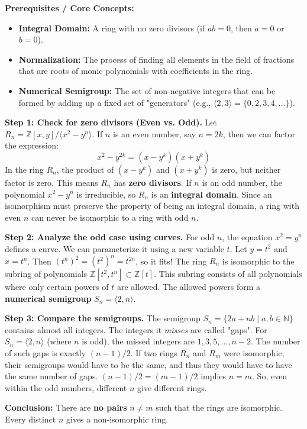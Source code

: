 \begin{solution}
\textbf{Prerequisites / Core Concepts:}
\begin{itemize}
    \item \textbf{Integral Domain:} A ring with no zero divisors (if $ab=0$, then $a=0$ or $b=0$).
    \item \textbf{Normalization:} The process of finding all elements in the field of fractions that are roots of monic polynomials with coefficients in the ring.
    \item \textbf{Numerical Semigroup:} The set of non-negative integers that can be formed by adding up a fixed set of "generators" (e.g., $\langle 2, 3 \rangle = \{0, 2, 3, 4, \dots\}$).
\end{itemize}

\textbf{Step 1: Check for zero divisors (Even vs. Odd).}
Let $R_n = \mathbb{Z}[x, y] / \langle x^2 - y^n \rangle$.
If $n$ is an even number, say $n=2k$, then we can factor the expression:
\[ x^2 - y^{2k} = (x - y^k)(x + y^k) \]
In the ring $R_n$, the product of $(x-y^k)$ and $(x+y^k)$ is zero, but neither factor is zero. This means $R_n$ has \textbf{zero divisors}.
If $n$ is an odd number, the polynomial $x^2 - y^n$ is irreducible, so $R_n$ is an \textbf{integral domain}.
Since an isomorphism must preserve the property of being an integral domain, a ring with even $n$ can never be isomorphic to a ring with odd $n$.

\textbf{Step 2: Analyze the odd case using curves.}
For odd $n$, the equation $x^2 = y^n$ defines a curve. We can parameterize it using a new variable $t$.
Let $y = t^2$ and $x = t^n$. Then $(t^n)^2 = (t^2)^n = t^{2n}$, so it fits!
The ring $R_n$ is isomorphic to the subring of polynomials $\mathbb{Z}[t^2, t^n] \subset \mathbb{Z}[t]$.
This subring consists of all polynomials where only certain powers of $t$ are allowed. The allowed powers form a \textbf{numerical semigroup} $S_n = \langle 2, n \rangle$.

\textbf{Step 3: Compare the semigroups.}
The semigroup $S_n = \{ 2a + nb \mid a, b \in \mathbb{N} \}$ contains almost all integers. The integers it \textit{misses} are called "gaps".
For $S_n = \langle 2, n \rangle$ (where $n$ is odd), the missed integers are $1, 3, 5, \dots, n-2$.
The number of such gaps is exactly $(n-1)/2$.
If two rings $R_n$ and $R_m$ were isomorphic, their semigroups would have to be the same, and thus they would have to have the same number of gaps.
$(n-1)/2 = (m-1)/2$ implies $n = m$.
So, even within the odd numbers, different $n$ give different rings.

\textbf{Conclusion:}
There are \textbf{no pairs} $n \neq m$ such that the rings are isomorphic. Every distinct $n$ gives a non-isomorphic ring.
\end{solution}

